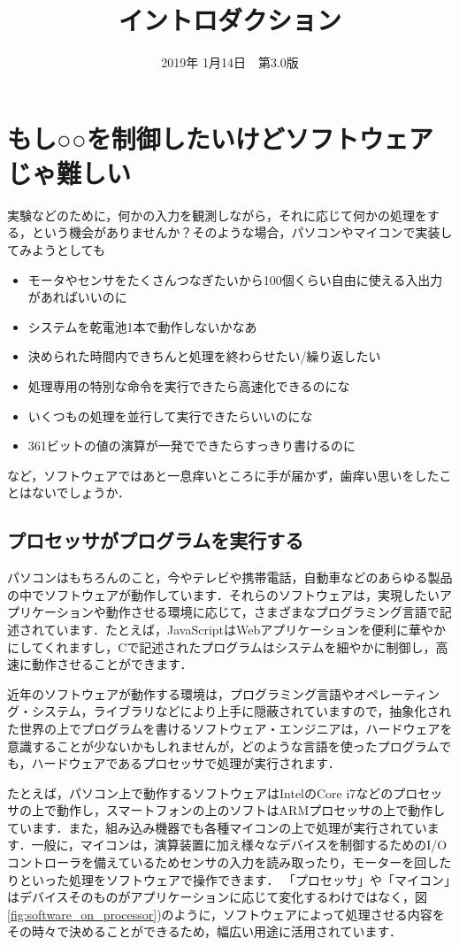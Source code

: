 \documentclass[a4paper,dvipdfmx]{jsarticle}
\begin{document}
\title{イントロダクション}
\author{}
\date{2019年 1月14日~~第3.0版}
\maketitle

\section{もし○○を制御したいけどソフトウェアじゃ難しい}
実験などのために，何かの入力を観測しながら，それに応じて何かの処理をする，という機会がありませんか？そのような場合，パソコンやマイコンで実装してみようとしても
\begin{itemize}
 \item モータやセンサをたくさんつなぎたいから100個くらい自由に使える入出力があればいいのに
 \item システムを乾電池1本で動作しないかなあ
 \item 決められた時間内できちんと処理を終わらせたい/繰り返したい
 \item 処理専用の特別な命令を実行できたら高速化できるのにな
 \item いくつもの処理を並行して実行できたらいいのにな
 \item 361ビットの値の演算が一発でできたらすっきり書けるのに
\end{itemize}
など，ソフトウェアではあと一息痒いところに手が届かず，歯痒い思いをしたことはないでしょうか．

\subsection{プロセッサがプログラムを実行する}
パソコンはもちろんのこと，今やテレビや携帯電話，自動車などのあらゆる製品の中でソフトウェアが動作しています．それらのソフトウェアは，実現したいアプリケーションや動作させる環境に応じて，さまざまなプログラミング言語で記述されています．たとえば，JavaScriptはWebアプリケーションを便利に華やかにしてくれますし，Cで記述されたプログラムはシステムを細やかに制御し，高速に動作させることができます．

近年のソフトウェアが動作する環境は，プログラミング言語やオペレーティング・システム，ライブラリなどにより上手に隠蔽されていますので，抽象化された世界の上でプログラムを書けるソフトウェア・エンジニアは，ハードウェアを意識することが少ないかもしれませんが，どのような言語を使ったプログラムでも，ハードウェアであるプロセッサで処理が実行されます．

たとえば，パソコン上で動作するソフトウェアはIntelのCore i7などのプロセッサの上で動作し，スマートフォンの上のソフトはARMプロセッサの上で動作しています．また，組み込み機器でも各種マイコンの上で処理が実行されています．一般に，マイコンは，演算装置に加え様々なデバイスを制御するためのI/Oコントローラを備えているためセンサの入力を読み取ったり，モーターを回したりといった処理をソフトウェアで操作できます．
「プロセッサ」や「マイコン」はデバイスそのものがアプリケーションに応じて変化するわけではなく，図\ref{fig:software_on_processor})のように，ソフトウェアによって処理させる内容をその時々で決めることができるため，幅広い用途に活用されています．
\end{document}
